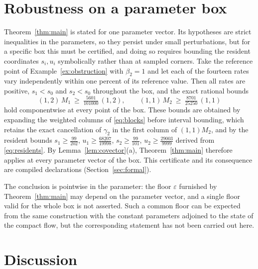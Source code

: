 \documentclass[11pt,a4paper]{article}
\theoremstyle{plain}
\theoremstyle{definition}
\theoremstyle{remark}
\newcommand{\eps}{\varepsilon}
\begin{document}
\section{Robustness on a parameter box}\label{sec:robust}

Theorem~\ref{thm:main} is stated for one parameter vector. Its hypotheses are strict inequalities in the parameters, so they persist under small perturbations, but for a specific box this must be certified, and doing so requires bounding the resident coordinates $s_i,u_i$ symbolically rather than at sampled corners. Take the reference point of Example~\ref{ex:obstruction} with $\beta_2=1$ and let each of the fourteen rates vary independently within one percent of its reference value. Then all rates are positive, $s_1<s_0$ and $s_2<s_0$ throughout the box, and the exact rational bounds
\[
 (1,2)\,M_1\ \ge\ \tfrac{5601}{101000}\,(1,2),\qquad (1,1)\,M_2\ \ge\ \tfrac{8701}{25250}\,(1,1)
\]
hold componentwise at every point of the box. These bounds are obtained by expanding the weighted columns of \eqref{eq:blocks} before interval bounding, which retains the exact cancellation of $\gamma_2$ in the first column of $(1,1)M_2$, and by the resident bounds $s_1\ge\tfrac{99}{202}$, $u_1\ge\tfrac{68207}{19998}$, $s_2\ge\tfrac{99}{101}$, $u_2\ge\tfrac{29003}{9999}$ derived from \eqref{eq:residents}. By Lemma~\ref{lem:covector}(a), Theorem~\ref{thm:main} therefore applies at every parameter vector of the box. This certificate and its consequence are compiled declarations (Section~\ref{sec:formal}).

The conclusion is pointwise in the parameter: the floor $\eps$ furnished by Theorem~\ref{thm:main} may depend on the parameter vector, and a single floor valid for the whole box is not asserted. Such a common floor can be expected from the same construction with the constant parameters adjoined to the state of the compact flow, but the corresponding statement has not been carried out here.

\section{Discussion}\label{sec:discussion}
\end{document}
